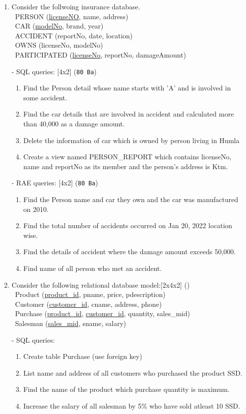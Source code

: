 \documentclass[12pt]{article}
\newcommand{\enter}{\\\textcolor{white}{1}}
\begin{document}
\begin{enumerate}
    \item Consider the follwoing insurance database.
        \enter PERSON (\underline{licenseNO}, name, address)
        \enter CAR (\underline{modelNo}, brand, year)
        \enter ACCIDENT (reportNo, date, location)
        \enter OWNS (licenseNo, modelNo)
        \enter PARTICIPATED (\underline{licenseNo}, reportNo, damageAmount)
        
        - SQL queries: \hfill[4x2] (\texttt{80 Ba})
        \begin{enumerate}[noitemsep, topsep = 0pt, label = \alph*.]
                \item Find the Person detail whose name starts with 'A' and is involved in some accident.
                \item Find the car details that are involved in accident and calculated more than 40,000 as a damage amount.
                \item Delete the information of car which is owned by person living in Humla
                \item Create a view named PERSON\_REPORT which contains licenseNo, name and reportNo as its member and the person's address is Ktm.
        \end{enumerate}

        - RAE queries: \hfill[4x2] (\texttt{80 Ba})
        \begin{enumerate}[noitemsep, topsep = 0pt, label = \alph*.]
                \item Find the Person name and car they own and the car was manufactured on 2010.
                \item Find the total number of accidents occurred on Jan 20, 2022 location wise.
                \item Find the details of accident where the damage amount exceeds 50,000.
                \item Find name of all person who met an accident.
        \end{enumerate}

    \item Consider the following relational database model:\hfill [2x4x2] ()
        \enter Product (\underline{product\_id}, pname, price, pdescription)
        \enter Customer (\underline{customer\_id}, cname, address, phone)
        \enter Purchase (\underline{product\_id}, \underline{customer\_id}, quantity, sales\_mid)
        \enter Salesman (\underline{sales\_mid}, sname, salary)

        - SQL queries: 
        \begin{enumerate}[noitemsep, topsep = 0pt, label = \alph*.]
                \item Create table Purchase (use foreign key)
            \item List name and address of all customers who purchased the product SSD.
            \item Find the name of the product which purchase quantity is maximum.
            \item Increase the salary of all salesman by 5\% who have sold atleast 10 SSD.
        \end{enumerate}


\end{enumerate}
\end{document}
